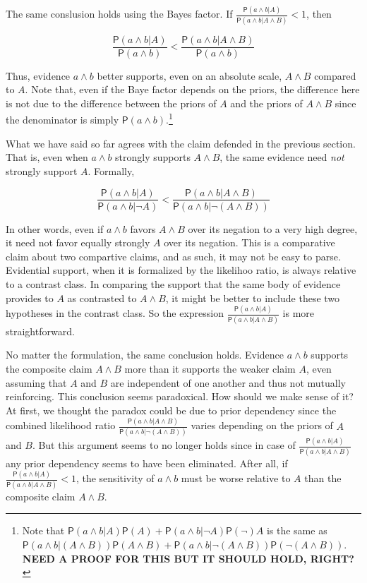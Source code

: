 \documentclass[10pt,dvipsnames,enabledeprecatedfontcommands]{scrartcl}
\newcommand{\pr}[1]{\mathsf{P}(#1)}
\begin{document}
The same conslusion holds using the Bayes factor. If
\(\frac{\pr{a\wedge b \vert A}}{\pr{a\wedge b \vert A \wedge B}}<1\),
then

\[\frac{\pr{a\wedge b \vert A}}{\pr{a\wedge b}} < \frac{\pr{a\wedge b \vert A \wedge B}}{\pr{a\wedge b}}   \]

\noindent
Thus, evidence \(a\wedge b\) better supports, even on an absolute scale,
\(A \wedge B\) compared to \(A\). Note that, even if the Baye factor
depends on the priors, the difference here is not due to the difference
between the priors of \(A\) and the priors of \(A\wedge B\) since the
denominator is simply
\(\pr{a\wedge b}\).\footnote{Note that $\pr{a\wedge b \vert A}\pr{A}+ \pr{a\wedge b \vert \neg A}\pr\neg {A}$ is the same as $\pr{a\wedge b \vert (A\wedge B)}\pr{A\wedge B}+ \pr{a\wedge b \vert \neg (A\wedge B)}\pr{\neg (A\wedge B)}$. \textbf{NEED A PROOF FOR THIS BUT IT SHOULD HOLD, RIGHT?}}

What we have said so far agrees with the claim defended in the previous
section. That is, even when \(a\wedge b\) strongly supports
\(A \wedge B\), the same evidence need \textit{not} strongly support
\(A\). Formally,

\[\frac{\pr{a\wedge b \vert A}}{\pr{a\wedge b \vert \neg A}} < \frac{\pr{a\wedge b \vert A \wedge B}}{\pr{a\wedge b \vert \neg (A \wedge B)}}\]

\noindent
In other words, even if \(a\wedge b\) favors \(A\wedge B\) over its
negation to a very high degree, it need not favor equally strongly \(A\)
over its negation. This is a comparative claim about two compartive
claims, and as such, it may not be easy to parse. Evidential support,
when it is formalized by the likelihoo ratio, is always relative to a
contrast class. In comparing the support that the same body of evidence
provides to \(A\) as contrasted to \(A\wedge B\), it might be better to
include these two hypotheses in the contrast class. So the expression
\(\frac{\pr{a\wedge b \vert A}}{\pr{a\wedge b \vert A \wedge B}}\) is
more straightforward.

No matter the formulation, the same conclusion holds. Evidence
\(a\wedge b\) supports the composite claim \(A\wedge B\) more than it
supports the weaker claim \(A\), even assuming that \(A\) and \(B\) are
independent of one another and thus not mutually reinforcing. This
conclusion seems paradoxical. How should we make sense of it? At first,
we thought the paradox could be due to prior dependency since the
combined likelihood ratio
\(\frac{\pr{a\wedge b \vert A \wedge B}}{\pr{a\wedge b \vert \neg (A \wedge B)}}\)
varies depending on the priors of \(A\) and \(B\). But this argument
seems to no longer holds since in case of
\(\frac{\pr{a\wedge b \vert A}}{\pr{a\wedge b \vert A \wedge B}}\) any
prior dependency seems to have been eliminated. After all, if
\(\frac{\pr{a\wedge b \vert A}}{\pr{a\wedge b \vert A \wedge B}}<1\),
the sensitivity of \(a\wedge b\) must be worse relative to \(A\) than
the composite claim \(A \wedge B\).
\end{document}
